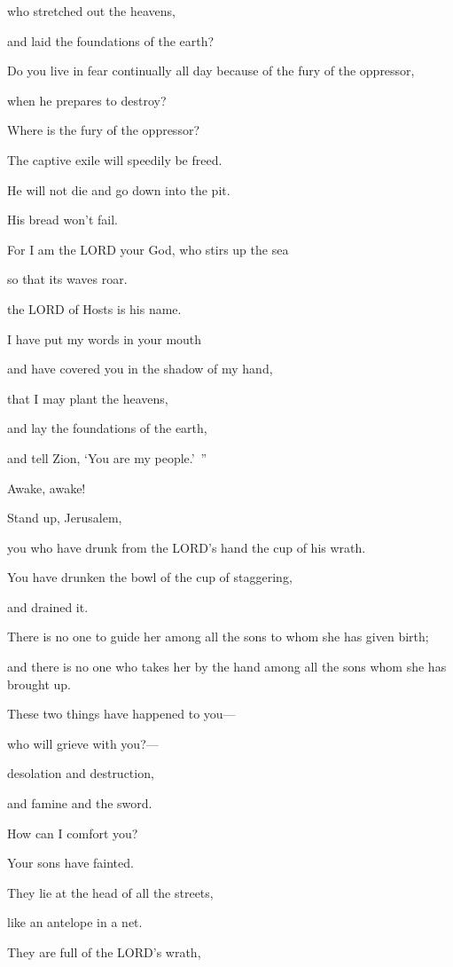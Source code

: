 who stretched out the heavens,

and laid the foundations of the earth?

Do you live in fear continually all day because of the fury of the oppressor,

when he prepares to destroy?

Where is the fury of the oppressor?

\myverse{}The captive exile will speedily be freed.

He will not die and go down into the pit.

His bread won’t fail.

\myverse{}For I am the LORD your God, who stirs up the sea

so that its waves roar.

the LORD of Hosts is his name.

\myverse{}I have put my words in your mouth

and have covered you in the shadow of my hand,

that I may plant the heavens,

and lay the foundations of the earth,

and tell Zion, ‘You are my people.’ ”


\vspace{\baselineskip} \myverse{}Awake, awake!

Stand up, Jerusalem,

you who have drunk from the LORD’s hand the cup of his wrath.

You have drunken the bowl of the cup of staggering,

and drained it.

\myverse{}There is no one to guide her among all the sons to whom she
has given birth;

and there is no one who takes her by the hand among all the sons whom she has
brought up.

\myverse{}These two things have happened to you—

who will grieve with you?—

desolation and destruction,

and famine and the sword.

How can I comfort you?

\myverse{}Your sons have fainted.

They lie at the head of all the streets,

like an antelope in a net.

They are full of the LORD’s wrath,

